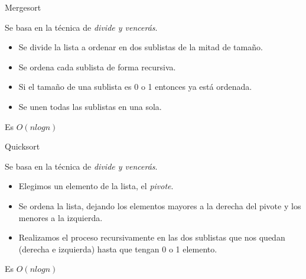\documentclass[spanish]{beamer}
\begin{document}
\begin{frame}
	\begin{center}
		
	\end{center}
\end{frame}

\begin{frame}{Mergesort}

	Se basa en la técnica de \textit{divide y vencerás}.

	\vskip 0.5cm
	
	\begin{itemize}
		\item Se divide la lista a ordenar en dos sublistas de la mitad de tamaño.
		\item Se ordena cada sublista de forma recursiva.
		\item Si el tamaño de una sublista es 0 o 1 entonces ya está ordenada.
		\item Se unen todas las sublistas en una sola.
	\end{itemize}
	
	\vskip 0.5cm
	
	Es $O(nlogn)$
\end{frame}

\begin{frame}
	\begin{center}
		
	\end{center}
\end{frame}

\begin{frame}{Quicksort}

	Se basa en la técnica de \textit{divide y vencerás}.

	\vskip 0.5cm
	
	\begin{itemize}
		\item Elegimos un elemento de la lista, el \textit{pivote}.
		\item Se ordena la lista, dejando los elementos mayores a la derecha del pivote y los menores a la izquierda.
		\item Realizamos el proceso recursivamente en las dos sublistas que nos quedan (derecha e izquierda) hasta que tengan 0 o 1 elemento.
	\end{itemize}
	
	\vskip 0.5cm
	
	Es $O(nlogn)$
\end{frame}

\begin{frame}
	\begin{center}
		
	\end{center}
\end{frame}
\end{document}
